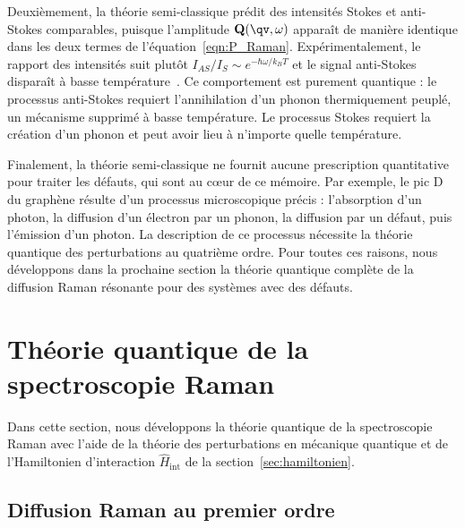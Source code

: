 Deuxièmement, la théorie semi-classique prédit des intensités Stokes et anti-Stokes comparables, puisque l'amplitude $\mathbf{Q}(\qv,\omega)$ apparaît de manière identique dans les deux termes de l'équation~\eqref{eqn:P_Raman}. Expérimentalement, le rapport des intensités suit plutôt $I_{AS}/I_S\sim e^{-\hbar\omega/k_BT}$ et le signal anti-Stokes disparaît à basse température~\cite{cardonaLightScatteringSolids1982,cardonaLightScatteringSolids1983}. Ce comportement est purement quantique : le processus anti-Stokes requiert l'annihilation d'un phonon thermiquement peuplé, un mécanisme supprimé à basse température. Le processus Stokes requiert la création d'un phonon et peut avoir lieu à n'importe quelle température.

Finalement, la théorie semi-classique ne fournit aucune prescription quantitative pour traiter les défauts, qui sont au c\oe ur de ce mémoire. Par exemple, le pic D du graphène résulte d'un processus microscopique précis : l'absorption d'un photon, la diffusion d'un électron par un phonon, la diffusion par un défaut, puis l'émission d'un photon. La description de ce processus nécessite la théorie quantique des perturbations au quatrième ordre. Pour toutes ces raisons, nous développons dans la prochaine section la théorie quantique complète de la diffusion Raman résonante pour des systèmes avec des défauts. 

\section{Théorie quantique de la spectroscopie Raman}\label{sec:raman_quantique}

Dans cette section, nous développons la théorie quantique de la spectroscopie Raman avec l'aide de la théorie des perturbations en mécanique quantique et de l'Hamiltonien d'interaction $\hat{H}_\text{int}$ de la section~\ref{sec:hamiltonien}.

\subsection{Diffusion Raman au premier ordre}\label{sec:Raman_premier_ordre}

